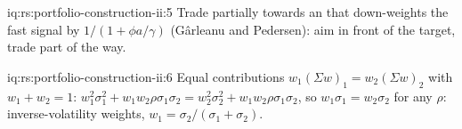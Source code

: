 \begin{solution}{iq:rs:portfolio-construction-ii:5}
Trade partially towards an  that down-weights the fast signal by $1/(1 + \phi a/\gamma)$ (Gârleanu and Pedersen): aim in front of the target, trade
part of the way.
\end{solution}

\begin{solution}{iq:rs:portfolio-construction-ii:6}
Equal contributions $w_1(\Sigma w)_1 = w_2(\Sigma w)_2$ with $w_1 + w_2 = 1$: $w_1^2\sigma_1^2 + w_1w_2\rho\sigma_1\sigma_2 = w_2^2\sigma_2^2 + w_1w_2\rho\sigma_1\sigma_2$, so
$w_1\sigma_1 = w_2\sigma_2$ for any $\rho$: inverse-volatility weights, $w_1 = \sigma_2/(\sigma_1 + \sigma_2)$.
\end{solution}
